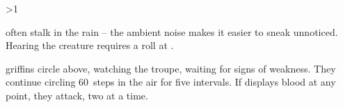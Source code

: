 \ifnum\value{temperature}>1

 often stalk in the rain -- the ambient noise makes it easier to sneak unnoticed.
\chitincrawler
Hearing the creature requires a  roll at
\tn.
\label{crawlerStatblock}

\else

\Glspl{griffin} circle above, watching the troupe, waiting for signs of weakness.
They continue circling 60~\glspl{step} in the air for five \glspl{interval}.
If  displays blood at any point, they attack, two at a time.

\griffin

\fi

